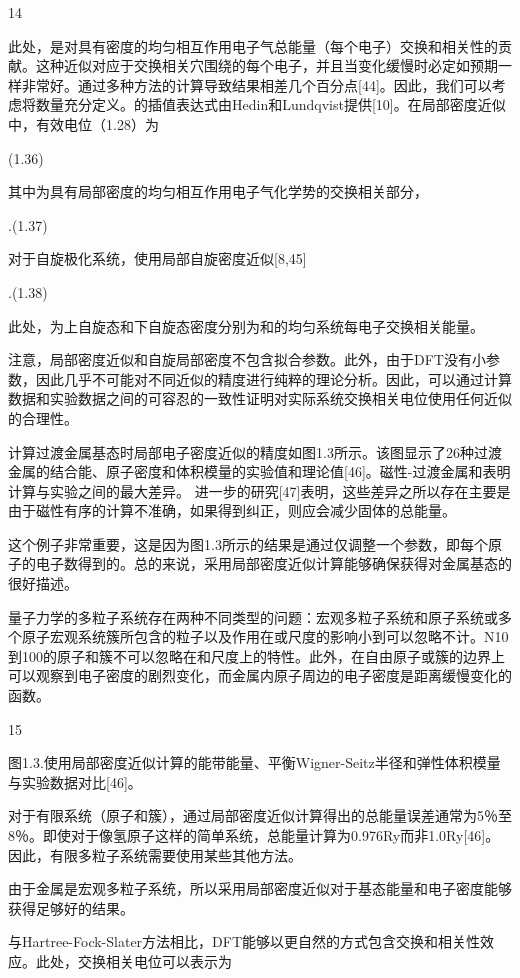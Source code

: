 14

此处，是对具有密度的均匀相互作用电子气总能量（每个电子）交换和相关性的贡献。这种近似对应于交换相关穴围绕的每个电子，并且当变化缓慢时必定如预期一样非常好。通过多种方法的计算导致结果相差几个百分点[44]。因此，我们可以考虑将数量充分定义。的插值表达式由Hedin和Lundqvist提供[10]。在局部密度近似中，有效电位（1.28）为

(1.36)

其中为具有局部密度的均匀相互作用电子气化学势的交换相关部分，

.(1.37)

对于自旋极化系统，使用局部自旋密度近似[8,45]

.(1.38)

此处，为上自旋态和下自旋态密度分别为和的均匀系统每电子交换相关能量。

注意，局部密度近似和自旋局部密度不包含拟合参数。此外，由于DFT没有小参数，因此几乎不可能对不同近似的精度进行纯粹的理论分析。因此，可以通过计算数据和实验数据之间的可容忍的一致性证明对实际系统交换相关电位使用任何近似的合理性。

计算过渡金属基态时局部电子密度近似的精度如图1.3所示。该图显示了26种过渡金属的结合能、原子密度和体积模量的实验值和理论值[46]。磁性-过渡金属和表明计算与实验之间的最大差异。 进一步的研究[47]表明，这些差异之所以存在主要是由于磁性有序的计算不准确，如果得到纠正，则应会减少固体的总能量。

这个例子非常重要，这是因为图1.3所示的结果是通过仅调整一个参数，即每个原子的电子数得到的。总的来说，采用局部密度近似计算能够确保获得对金属基态的很好描述。

量子力学的多粒子系统存在两种不同类型的问题：宏观多粒子系统和原子系统或多个原子宏观系统簇所包含的粒子以及作用在或尺度的影响小到可以忽略不计。N10到100的原子和簇不可以忽略在和尺度上的特性。此外，在自由原子或簇的边界上可以观察到电子密度的剧烈变化，而金属内原子周边的电子密度是距离缓慢变化的函数。


15


图1.3.使用局部密度近似计算的能带能量、平衡Wigner-Seitz半径和弹性体积模量与实验数据对比[46]。

对于有限系统（原子和簇），通过局部密度近似计算得出的总能量误差通常为5％至8％。即使对于像氢原子这样的简单系统，总能量计算为0.976Ry而非1.0Ry[46]。因此，有限多粒子系统需要使用某些其他方法。

由于金属是宏观多粒子系统，所以采用局部密度近似对于基态能量和电子密度能够获得足够好的结果。

与Hartree-Fock-Slater方法相比，DFT能够以更自然的方式包含交换和相关性效应。此处，交换相关电位可以表示为

